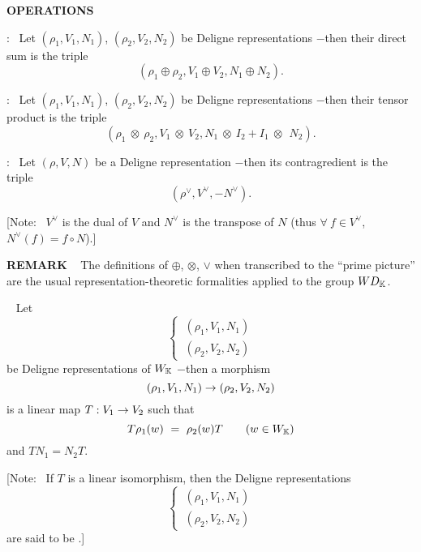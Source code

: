 \vspace{0.1cm}
\begin{x}{\small\bf OPERATIONS} \ %

\vspace{0.3cm}

\qquad \textbullet \quad {}: \ Let $(\rho_1,V_1,N_1)$, $(\rho_2,V_2,N_2)$ be Deligne representations 
$-$then their direct sum is the triple 
\[
(\rho_1 \oplus \rho_2,V_1 \oplus V_2 ,N_1 \oplus N_2).
\]

\qquad \textbullet \quad {}: \ Let $(\rho_1,V_1,N_1)$, $(\rho_2,V_2,N_2)$ be Deligne representations 
$-$then their tensor product is the triple
\[
(\rho_1 \  \otimes \  \rho_2,V_1 \  \otimes \ V_2 ,N_1 \ \otimes \  I_2 + I_1 \  \otimes\  \ N_2).
\]

\qquad \textbullet \quad {}: \ Let $(\rho,V,N)$ be a Deligne representation $-$then its contragredient is the triple 
\[
(\rho^\vee, V^\vee, -N^\vee).
\]

[Note: \ 
$V^\vee$ is the dual of $V$ and $N^\vee$ is the transpose of $N$ (thus $\forall \ f \in V^\vee$, 
$N^\vee(f) = f \circ N$).]
\end{x}

\vspace{0.1cm}

\begin{x}{\small\bf REMARK} \ %
The definitions of $\oplus$, $\otimes$, $\vee$ when transcribed to the ``prime picture'' are the usual 
representation-theoretic formalities applied to the group $WD_{\mathbb{K}}$.  
\end{x}

\vspace{0.1cm}

\begin{x}{\small\bf {}} \ %
Let 
\[
\begin{cases}
\ (\rho_1,V_1,N_1)\\
\ (\rho_2,V_2,N_2)
\end{cases}
\]
be Deligne representations of $W_{\mathbb{K}}$ $-$then a morphism 
\[
(\rho_1,V_1,N_1) \rightarrow (\rho_2,V_2,N_2)
\]
is a linear map $T:V_1 \rightarrow V_2$ such that 
\[
T \rho_1 (w) \ = \  \rho_2(w) T \qquad (w \in W_{\mathbb{K}})
\]
and $T N_1 = N_2 T$.

[Note: \ 
If $T$ is a linear isomorphism, then the Deligne representations 
\[
\begin{cases}
\ (\rho_1,V_1,N_1)\\
\ (\rho_2,V_2,N_2)
\end{cases}
\]
are said to be .]
\end{x}

